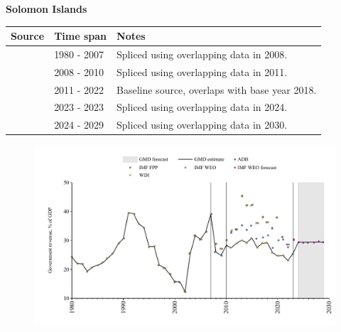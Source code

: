 \documentclass[12pt,a4paper,landscape]{article}
\begin{document}
\begin{adjustbox}{max totalsize={\paperwidth}{\paperheight},center}
\begin{minipage}[t][\textheight][t]{\textwidth}
\vspace*{0.5cm}
{}
\begin{center}
{\Large\bfseries Solomon Islands}
\end{center}
\vspace{0.5cm}
\begin{table}[H]
\centering
\small
\begin{tabular}{|l|l|l|}
\hline
\textbf{Source} & \textbf{Time span} & \textbf{Notes} \\
\hline
\rowcolor{white}\cite{IMF_WEO}& 1980 - 2007 &Spliced using overlapping data in 2008.\\
\rowcolor{lightgray}\cite{ADB}& 2008 - 2010 &Spliced using overlapping data in 2011.\\
\rowcolor{white}\cite{WDI}& 2011 - 2022 &Baseline source, overlaps with base year 2018.\\
\rowcolor{lightgray}\cite{ADB}& 2023 - 2023 &Spliced using overlapping data in 2024.\\
\rowcolor{white}\cite{IMF_WEO_forecast}& 2024 - 2029 &Spliced using overlapping data in 2030.\\
\hline
\end{tabular}
\end{table}
\begin{figure}[H]
\centering
\includegraphics[width=\textwidth,height=0.6\textheight,keepaspectratio]{graphs/SLB_govrev_GDP.pdf}
\end{figure}
\end{minipage}
\end{adjustbox}
\end{document}
